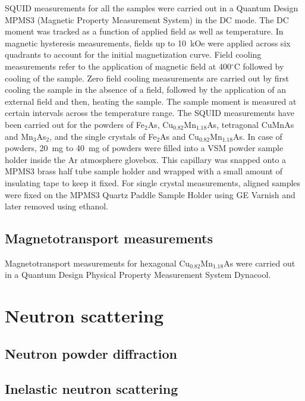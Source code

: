 \documentclass[10pt,doublespacing,edeposit]{uiucthesis2020}
\begin{document}
\begin{mainmatter}
SQUID measurements for all the samples were carried out in a Quantum Design MPMS3 (Magnetic Property Measurement System) in the DC mode. The DC moment was tracked as a function of applied field as well as temperature. In magnetic hysteresis measurements, fields up to 10~kOe were applied across six quadrants to account for the initial magnetization curve. Field cooling measurements refer to the application of magnetic field at 400$^\circ$C followed by cooling of the sample. Zero field cooling measurements are carried out by first cooling the sample in the absence of a field, followed by the application of an external field and then, heating the sample. The sample moment is measured at certain intervals across the temperature range. The SQUID measurements have been carried out for the powders of Fe$_2$As, Cu$_{0.82}$Mn$_{1.18}$As, tetragonal CuMnAs and Mn$_3$As$_2$, and the single crystals of Fe$_2$As and Cu$_{0.82}$Mn$_{1.18}$As. In case of powders, 20~mg to 40~mg of powders were filled into a VSM powder sample holder inside the Ar atmosphere glovebox. This capillary was snapped onto a MPMS3 brass half tube sample holder and wrapped with a small amount of insulating tape to keep it fixed. For single crystal measurements, aligned samples were fixed on the MPMS3 Quartz Paddle Sample Holder using GE Varnish and later removed using ethanol.


\subsection{Magnetotransport measurements}


Magnetotransport measurements for hexagonal Cu$_{0.82}$Mn$_{1.18}$As were carried out in a Quantum Design Physical Property Measurement System Dynacool.

\section{Neutron scattering}

\subsection{Neutron powder diffraction}

\subsection{Inelastic neutron scattering}


\end{mainmatter}
\end{document}

